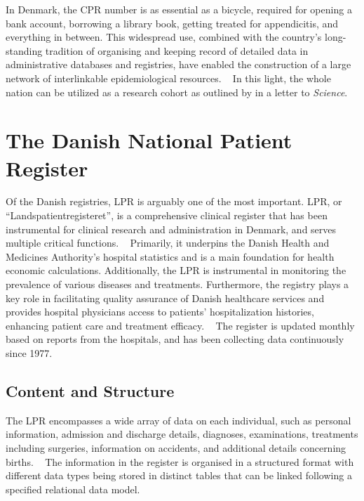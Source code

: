In Denmark, the \ac{CPR} number is as essential as a bicycle, 
required for opening a bank account, 
borrowing a library book, 
getting treated for appendicitis, and everything in between.
This widespread use, 
combined with the country's long-standing tradition
of organising and keeping record of detailed data in 
administrative databases and registries,
have enabled the construction of a large network
of interlinkable epidemiological resources.
~\autocite{schmidtDanish2019}
In this light, the whole nation can be utilized as a research cohort
as outlined by \textcite{frankEpidemiology2000} in a letter
to \textit{Science}.

\section{The Danish National Patient Register}

Of the Danish registries, \ac{LPR} is arguably one of the most important.
\ac{LPR}, or \enquote{Landspatientregisteret}, 
is a comprehensive clinical register that has
been instrumental for clinical research and administration in Denmark,
and serves multiple critical functions.
~\autocite{schmidtDanish2015}
Primarily, it underpins the Danish Health and Medicines Authority's hospital
statistics and is a main foundation for health economic calculations.
Additionally, the \ac{LPR} is instrumental in monitoring the
prevalence of various diseases and treatments. 
Furthermore, the registry plays a key role in
facilitating quality assurance of Danish healthcare services and provides
hospital physicians access to patients' hospitalization histories, enhancing
patient care and treatment efficacy.
~\autocite{schmidtDanish2015}
The register is updated monthly based on reports from the hospitals,
and has been collecting data continuously since 1977.
~\autocite{schmidtDanish2015}

\subsection{Content and Structure}

The \ac{LPR} encompasses a wide array of data on each individual, 
such as personal information, admission and discharge details, diagnoses, 
examinations, treatments including surgeries, information on accidents, 
and additional details concerning births. 
~\autocite{schmidtDanish2015}
The information in the register is organised in a
structured format with different data types being stored 
in distinct tables that can be linked following a 
specified relational data model.
~\autocite{lpr2dok}

